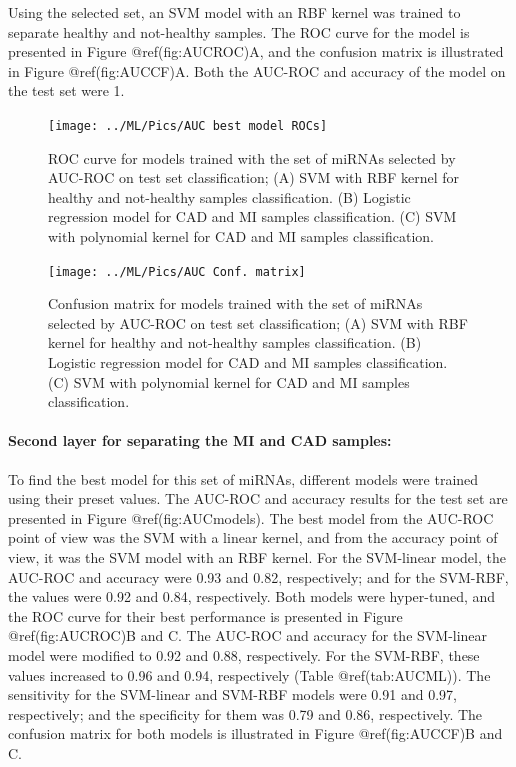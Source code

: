 \documentclass[
]{article}
\begin{document}
Using the selected set, an SVM model with an RBF kernel was trained to
separate healthy and not-healthy samples. The ROC curve for the model is
presented in Figure @ref(fig:AUCROC)A, and the confusion matrix is
illustrated in Figure @ref(fig:AUCCF)A. Both the AUC-ROC and accuracy of
the model on the test set were 1.

\begin{figure}

{\centering \texttt{[image: ../ML/Pics/AUC best model ROCs]} 

}

\caption{ROC curve for models trained with the set of miRNAs selected by AUC-ROC on test set classification; (A) SVM with RBF kernel for healthy and not-healthy samples classification. (B) Logistic regression model for CAD and MI samples classification. (C) SVM with polynomial kernel for CAD and MI samples classification. }\label{fig:AUCROC}
\end{figure}

\begin{figure}

{\centering \texttt{[image: ../ML/Pics/AUC Conf. matrix]} 

}

\caption{Confusion matrix for models trained with the set of miRNAs selected by AUC-ROC on test set classification; (A) SVM with RBF kernel for healthy and not-healthy samples classification. (B) Logistic regression model for CAD and MI samples classification. (C) SVM with polynomial kernel for CAD and MI samples classification.}\label{fig:AUCCF}
\end{figure}

\hypertarget{second-layer-for-separating-the-mi-and-cad-samples-3}{%
\paragraph{Second layer for separating the MI and CAD
samples:}\label{second-layer-for-separating-the-mi-and-cad-samples-3}}

To find the best model for this set of miRNAs, different models were
trained using their preset values. The AUC-ROC and accuracy results for
the test set are presented in Figure @ref(fig:AUCmodels). The best model
from the AUC-ROC point of view was the SVM with a linear kernel, and
from the accuracy point of view, it was the SVM model with an RBF
kernel. For the SVM-linear model, the AUC-ROC and accuracy were 0.93 and
0.82, respectively; and for the SVM-RBF, the values were 0.92 and 0.84,
respectively. Both models were hyper-tuned, and the ROC curve for their
best performance is presented in Figure @ref(fig:AUCROC)B and C. The
AUC-ROC and accuracy for the SVM-linear model were modified to 0.92 and
0.88, respectively. For the SVM-RBF, these values increased to 0.96 and
0.94, respectively (Table @ref(tab:AUCML)). The sensitivity for the
SVM-linear and SVM-RBF models were 0.91 and 0.97, respectively; and the
specificity for them was 0.79 and 0.86, respectively. The confusion
matrix for both models is illustrated in Figure @ref(fig:AUCCF)B and C.
\end{document}
